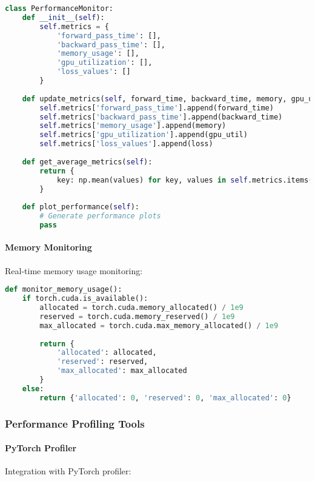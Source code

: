 \begin{lstlisting}[language=python, caption=Performance Monitoring]
class PerformanceMonitor:
    def __init__(self):
        self.metrics = {
            'forward_pass_time': [],
            'backward_pass_time': [],
            'memory_usage': [],
            'gpu_utilization': [],
            'loss_values': []
        }
    
    def update_metrics(self, forward_time, backward_time, memory, gpu_util, loss):
        self.metrics['forward_pass_time'].append(forward_time)
        self.metrics['backward_pass_time'].append(backward_time)
        self.metrics['memory_usage'].append(memory)
        self.metrics['gpu_utilization'].append(gpu_util)
        self.metrics['loss_values'].append(loss)
    
    def get_average_metrics(self):
        return {
            key: np.mean(values) for key, values in self.metrics.items()
        }
    
    def plot_performance(self):
        # Generate performance plots
        pass
\end{lstlisting}

\paragraph{Memory Monitoring}
Real-time memory usage monitoring:

\begin{lstlisting}[language=python, caption=Memory Monitoring]
def monitor_memory_usage():
    if torch.cuda.is_available():
        allocated = torch.cuda.memory_allocated() / 1e9
        reserved = torch.cuda.memory_reserved() / 1e9
        max_allocated = torch.cuda.max_memory_allocated() / 1e9
        
        return {
            'allocated': allocated,
            'reserved': reserved,
            'max_allocated': max_allocated
        }
    else:
        return {'allocated': 0, 'reserved': 0, 'max_allocated': 0}
\end{lstlisting}

\subsubsection{Performance Profiling Tools}

\paragraph{PyTorch Profiler}
Integration with PyTorch profiler:

